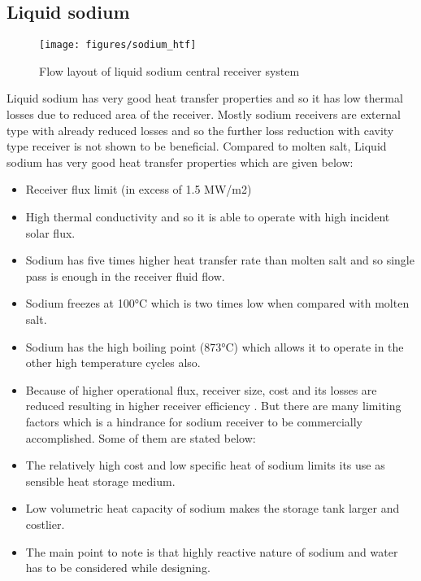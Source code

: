 \subsection{Liquid sodium}
\begin{figure}[h!]
	\texttt{[image: figures/sodium\_htf]}
	\centering
	\caption{Flow layout of liquid sodium central receiver system}
\end{figure}
Liquid sodium has very good heat transfer properties and so it has low thermal losses due to reduced area of the receiver. Mostly sodium receivers are external type with already reduced losses and so the further loss reduction with cavity type receiver is not shown to be beneficial. Compared to molten salt, Liquid sodium has very good heat transfer properties which are given below:
\begin{itemize}
\item Receiver flux limit (in excess of 1.5 MW/m2)
\item High thermal conductivity and so it is able to operate with high incident solar flux.
\item Sodium has five times higher heat transfer rate than molten salt and so single pass is enough in the receiver fluid flow.
\item Sodium freezes at 100°C which is two times low when compared with molten salt.
\item Sodium has the high boiling point (873°C) \cite{Nicholas.2012} which allows it to operate in the other high temperature cycles also.
\item Because of higher operational flux, receiver size, cost and its losses are reduced resulting in higher receiver efficiency .
But there are many limiting factors which is a hindrance for sodium receiver to be commercially accomplished. Some of them are stated below:
\item The relatively high cost and low specific heat of sodium limits its use as sensible heat storage medium. 
\item Low volumetric heat capacity of sodium makes the storage tank larger and costlier.
\item The main point to note is that highly reactive nature of sodium and water has to be considered while designing.
\end{itemize}
